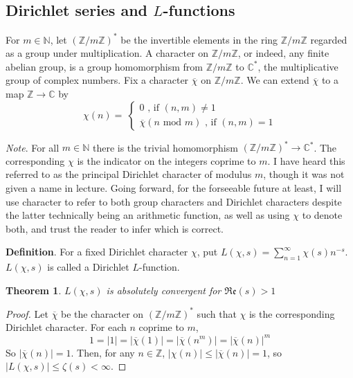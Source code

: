 \documentclass[12pt]{article}
\newcommand{\nats}{\mathbb{N}}
\newcommand{\ints}{\mathbb{Z}}
\newcommand{\complex}{\mathbb{C}}
\newcommand{\intsmod}[1]{\ints / #1 \ints}
\newtheorem{thm}{Theorem}
\numberwithin{equation}{section}
\numberwithin{thm}{section}
\numberwithin{lemma}{section}
\begin{document}
\subsection{Dirichlet series and $L$-functions}

For $m \in \nats$, let $(\intsmod{m})^*$ be the invertible elements in the ring $\intsmod{m}$ regarded as a group under multiplication. A character on $\intsmod{m}$, or indeed, any finite abelian group, is a group homomorphism from $\intsmod{m}$ to $\complex^*$, the multiplicative group of complex numbers. Fix a character $\overline{\chi}$ on $\intsmod{m}$. We can extend $\overline{\chi}$ to a map $\ints \to \complex$ by \begin{equation*}\chi(n) =~\begin{cases*} 0 \text{ , if } (n, m) \ne 1 \\ \overline{\chi}(n \text{ mod } m) \text{ , if } (n, m) = 1 \end{cases*}\end{equation*}

\textit{Note}. For all $m \in \nats$ there is the trivial homomorphism $(\intsmod{m})^* \to \complex^*$. The corresponding $\chi$ is the indicator on the integers coprime to $m$. I have heard this referred to as the principal Dirichlet character of modulus $m$, though it was not given a name in lecture. Going forward, for the forseeable future at least, I will use character to refer to both group characters and Dirichlet characters despite the latter technically being an arithmetic function, as well as using $\chi$ to denote both, and trust the reader to infer which is correct.

\textbf{Definition}. For a fixed Dirichlet character $\chi$, put $L(\chi, s) = \sum_{n = 1}^{\infty} \chi(s) n^{-s}$. $L(\chi, s)$ is called a Dirichlet $L$-function.

\begin{thm}
  $L(\chi, s)$ is absolutely convergent for $\mathfrak{Re}(s) > 1$
\end{thm}
\begin{proof}
  Let $\overline{\chi}$ be the character on $(\intsmod{m})^*$ such that $\chi$ is the corresponding Dirichlet character. For each $n$ coprime to $m$, \begin{equation*} 1 = |1| = |\overline{\chi}(1)| = |\overline{\chi}(n^m)| = |\overline{\chi}(n)|^m \end{equation*} So $|\overline{\chi}(n)| = 1$. Then, for any $n \in \ints$, $|\chi(n)| \leq |\overline{\chi}(n)| = 1$, so $|L(\chi, s)| \leq \zeta(s) < \infty$.
\end{proof}
\end{document}
